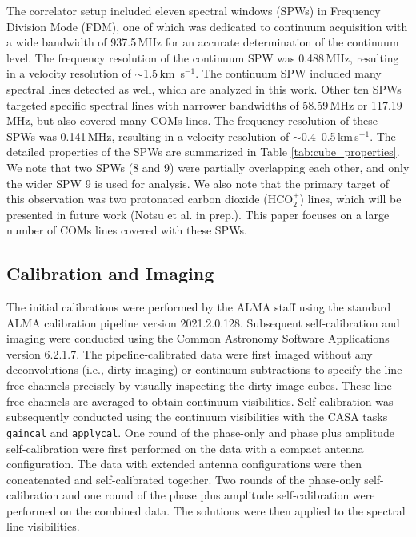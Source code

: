 \documentclass[linenumbers, twocolumn, twocolappendix, astrosymb, times]{aastex631}
\newcommand{\hcotp}{HCO$_2^+$}
\begin{document}
The correlator setup included eleven spectral windows (SPWs) in Frequency Division Mode (FDM), one of which was dedicated to continuum acquisition with a wide bandwidth of 937.5\,MHz for an accurate determination of the continuum level. The frequency resolution of the continuum SPW was 0.488\,MHz, resulting in a velocity resolution of $\sim$1.5\,km \,s$^{-1}$. The continuum SPW included many spectral lines detected as well, which are analyzed in this work. Other ten SPWs targeted specific spectral lines with narrower bandwidths of 58.59\,MHz or 117.19\,MHz, but also covered many COMs lines. The frequency resolution of these SPWs was 0.141\,MHz, resulting in a velocity resolution of $\sim$0.4--0.5\,km\,s$^{-1}$. 
The detailed properties of the SPWs are summarized in Table \ref{tab:cube_properties}. We note that two SPWs (8 and 9) were partially overlapping each other, and only the wider SPW 9 is used for analysis. We also note that the primary target of this observation was two protonated carbon dioxide (\hcotp) lines, which will be presented in future work (Notsu et al. in prep.). This paper focuses on a large number of COMs lines covered with these SPWs.


\subsection{Calibration and Imaging}
The initial calibrations were performed by the ALMA staff using the standard ALMA calibration pipeline version 2021.2.0.128. Subsequent self-calibration and imaging were conducted using the Common Astronomy Software Applications \citep[CASA;][]{CASA} version 6.2.1.7. The pipeline-calibrated data were first imaged without any deconvolutions (i.e., dirty imaging) or continuum-subtractions to specify the line-free channels precisely by visually inspecting the dirty image cubes. These line-free channels are averaged to obtain continuum visibilities. Self-calibration was subsequently conducted using the continuum visibilities with the CASA tasks \texttt{gaincal} and \texttt{applycal}. One round of the phase-only and phase plus amplitude self-calibration were first performed on the data with a compact antenna configuration. The data with extended antenna configurations were then concatenated and self-calibrated together. Two rounds of the phase-only self-calibration and one round of the phase plus amplitude self-calibration were performed on the combined data. The solutions were then applied to the spectral line visibilities.
\end{document}
